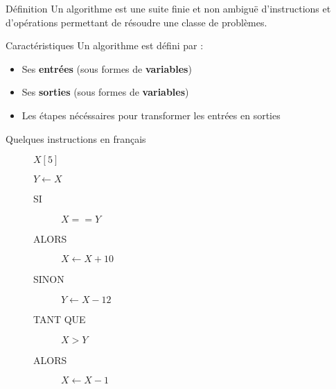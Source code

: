 \begin{frame}{Définition}
    Un algorithme est une suite finie et non ambiguë d'instructions et d’opérations permettant de résoudre une classe de problèmes.
\end{frame}

\begin{frame}{Caractéristiques}
    Un algorithme est défini par :
    \begin{itemize}
        \item Ses \textbf{entrées} (sous formes de \textbf{variables})
        \item Ses \textbf{sorties} (sous formes de \textbf{variables})
        \item Les étapes nécéssaires pour transformer les entrées en sorties
    \end{itemize}
\end{frame}

\begin{frame}{Quelques instructions en français}
    
    \begin{description}
        \item [] $X[5]\;\;\;\;\;$ 
        \item []
        \item [] $Y \leftarrow X\;$  
        \item []
        \item [] 
        \begin{description}
            \item [SI] $X == Y$
            \item [ALORS] $X \leftarrow X + 10$
            \item [SINON] $Y \leftarrow X - 12$
        \end{description}
        \item []
        \item [] 
        \begin{description}
            \item [TANT QUE] $X > Y$
            \item [ALORS] $X \leftarrow X - 1$
        \end{description}
    \end{description}

    
\end{frame}

